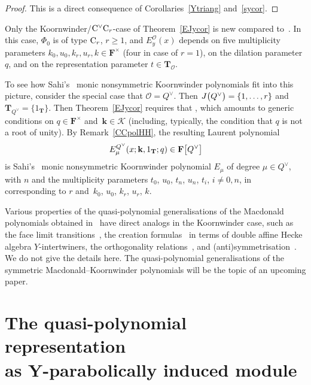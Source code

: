 \documentclass[pdftex]{sigma}
\numberwithin{equation}{section}
\begin{document}
\begin{proof}
This is a direct consequence of Corollaries~\ref{Ytriang} and~\ref{sycor}.
\end{proof}

Only the Koornwinder/${\rm C}^\vee{\rm C}_r$-case of Theorem~\ref{EJycor} is new compared to~\cite[Theorem~6.2]{SSV2}. In this case, $\Phi_0$ is of type ${\rm C}_r$, $r\geq 1$, and $E_y^\mathcal{O}(x)$ depends on five multiplicity parameters ${k_0,u_0,k_r,u_r,k\in\mathbf{F}^\times}$
(four in case of $r=1$), on the dilation parameter $q$, and on the representation parameter $t\in\mathbf{T}_\mathcal{O}$.

To see how Sahi's~\cite{Sa} monic nonsymmetric Koornwinder polynomials fit into this picture, consider the special case that $\mathcal{O}=Q^\vee$. Then
$J\smash{\bigl(Q^\vee\bigr)}=\{1,\dots,r\}$ and $\mathbf{T}_{Q^\vee}=\{1_{\mathbf{T}}\}$. Then Theorem~\ref{EJycor} requires that , which amounts to generic conditions on $q\in\mathbf{F}^\times$ and~${\mathbf{k}\in\mathcal{K}}$ (including, typically, the condition that $q$ is not a root of unity). By Remark~\ref{CCpolHH}, the resulting Laurent polynomial
\[
E_\mu^{Q^\vee}(x;\mathbf{k},1_{\mathbf{T}};q)\in\mathbf{F}\smash{\bigl[Q^\vee\bigr]}
\]
is Sahi's~\cite[Theorem~6.2]{Sa} monic nonsymmetric Koornwinder polynomial $E_\mu$ of degree $\mu\in Q^\vee$, with $n$ and the multiplicity parameters $t_0$, $u_0$, $t_n$, $u_n$, $t_i$, $i\not=0,n$, in~\cite{Sa} corresponding to $r$ and~$k_0$, $u_0$, $k_r$, $u_r$, $k$.

Various properties of the quasi-polynomial generalisations of the Macdonald polynomials obtained in~\cite{SSV2} have direct analogs in the Koornwinder case, such as
the face limit transitions~\cite[Proposition~6.15]{SSV2}, the creation formulas~\cite[Theorem~6.12]{SSV2} in terms of double affine Hecke algebra $Y$-intertwiners, the orthogonality relations~\cite[Theorem~6.42]{SSV2}, and (anti)symmetrisation~\cite[Section~6.6]{SSV2}. We do not give the details here. The quasi-polynomial generalisations of the symmetric Macdonald--Koornwinder polynomials will be the topic of an upcoming paper.

\section[The quasi-polynomial representation as Y-parabolically induced module]{The quasi-polynomial representation\\ as $\boldsymbol{Y}$-parabolically induced module}\label{InducedModuleSection}
\end{document}
